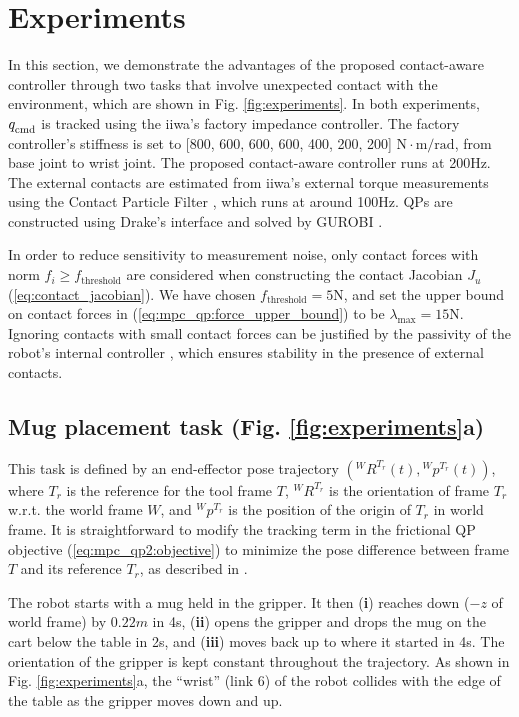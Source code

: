 \section{Experiments}
In this section, we demonstrate the advantages of the proposed contact-aware controller through two tasks that involve unexpected contact with the environment, which are shown in Fig. \ref{fig:experiments}. In both experiments, $q_{\text{cmd}}^{}$ is tracked using the iiwa's factory impedance controller. The factory controller's stiffness is set to [800, 600, 600, 600, 400, 200, 200] $\mathrm{N \cdot m/rad}$, from base joint to wrist joint. The proposed contact-aware controller runs at 200Hz. The external contacts are estimated from iiwa's external torque measurements using the Contact Particle Filter \cite{manuelli2016localizing}, which runs at around 100Hz. QPs are constructed using Drake's  interface \cite{drake} and solved by GUROBI \cite{gurobi}. 

In order to reduce sensitivity to measurement noise, only contact forces with norm $f_i \geq f_\text{threshold}$ are considered when constructing the contact Jacobian $J_u$ (\ref{eq:contact_jacobian}). We have chosen $f_\text{threshold}=5\mathrm{N}$, and set the upper bound on contact forces in (\ref{eq:mpc_qp:force_upper_bound}) to be $\lambda_{\text{max}}=15\mathrm{N}$. Ignoring contacts with small contact forces can be justified by the passivity of the robot's internal controller \cite{albu2007unified}, which ensures stability in the presence of external contacts.

\subsection{Mug placement task (Fig. \ref{fig:experiments}a)}
This task is defined by an end-effector pose trajectory $\left({}^W R^{T_r} (t), {}^W p^{T_r}(t)\right)$, where $T_r$ is the reference for the tool frame $T$, ${}^W R^{T_r}$ is the orientation of frame $T_r$ w.r.t. the world frame $W$, and $ {}^W p^{T_r}$ is the position of the origin of $T_r$ in world frame. It is straightforward to modify the tracking term in the frictional QP objective (\ref{eq:mpc_qp2:objective}) to minimize the pose difference between frame $T$ and its reference $T_r$, as described in \cite{koolen2016design} \cite[Chapter 3]{tedrake2021manipulation}.

The robot starts with a mug held in the gripper. It then (\textbf{i}) reaches down ($-z$ of world frame) by $0.22m$ in 4s, (\textbf{ii}) opens the gripper and drops the mug on the cart below the table in 2s, and (\textbf{iii}) moves back up to where it started in 4s. The orientation of the gripper is kept constant throughout the trajectory. As shown in Fig. \ref{fig:experiments}a, the ``wrist'' (link 6) of the robot collides with the edge of the table as the gripper moves down and up.

